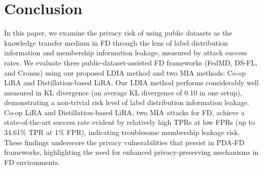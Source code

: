 \section{Conclusion}
\label{sec:conclusion}
In this paper, we examine the privacy risk of using public datasets as the knowledge transfer medium in FD through the lens of label distribution information and membership information leakage, measured by attack success rates.
We evaluate three public-dataset-assisted FD frameworks (FedMD, DS-FL, and Cronus) using our proposed LDIA method and two MIA methods: Co-op LiRA and Distillation-based LiRA.
Our LDIA method performs considerably well measured in KL divergence (an average KL divergence of 0.10 in one setup), demonstrating a non-trivial risk level of label distribution information leakage. 
Co-op LiRA and Distillation-based LiRA, two MIA attacks for FD, achieve a state-of-the-art success rate evident by relatively high TPRs at low FPRs (up to 34.61\% TPR at 1\% FPR), indicating troublesome membership leakage risk.
These findings underscore the privacy vulnerabilities that persist in PDA-FD frameworks, highlighting the need for enhanced privacy-preserving mechanisms in FD environments.